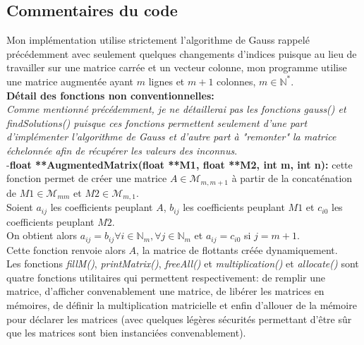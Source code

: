 \subsection{Commentaires du code}
Mon implémentation utilise strictement l'algorithme de Gauss rappelé précédemment avec seulement quelques changements d'indices puisque au lieu de travailler sur une matrice carrée et un vecteur colonne, mon programme utilise une matrice augmentée ayant $m$ lignes et $m+1$ colonnes, $m\in \mathbb{N}^*$. \\
\textbf{Détail des fonctions non conventionnelles:}\\
\textit{Comme mentionné précédemment, je ne détaillerai pas les fonctions \textit{gauss()} et \textit{findSolutions()} puisque ces fonctions permettent seulement d'une part d'implémenter l'algorithme de Gauss et d'autre part à "remonter" la matrice échelonnée afin de récupérer les valeurs des inconnus}. \\
-\textbf{float **AugmentedMatrix(float **M1, float **M2, int m, int n):} cette fonction permet de créer une matrice $A \in \mathcal{M}_{m,m+1}$ à partir de la concaténation de $M1 \in \mathcal{M}_{mm}$ et $M2 \in \mathcal{M}_{m,1}$. \\
Soient $a_{ij}$ les coefficients peuplant $A$, $b_{ij}$ les coefficients peuplant $M1$ et $c_{i0}$ les coefficients peuplant $M2$. \\
On obtient alors $a_{ij} = b_{ij} \forall i \in \mathbb{N}_{m}, \forall j \in \mathbb{N}_{m}$ et $a_{ij} = c_{i0}$ si $j = m+1$. \\
Cette fonction renvoie alors $A$, la matrice de flottants créée dynamiquement. \\
Les fonctions \textit{fillM()}, \textit{printMatrix()}, \textit{freeAll()} et \textit{multiplication()} et \textit{allocate()} sont quatre fonctions utilitaires qui permettent respectivement: de remplir une matrice, d'afficher convenablement une matrice, de libérer les matrices en mémoires, de définir la multiplication matricielle et enfin d'allouer de la mémoire pour déclarer les matrices (avec quelques légères sécurités permettant d'être sûr que les matrices sont bien instanciées convenablement). 
